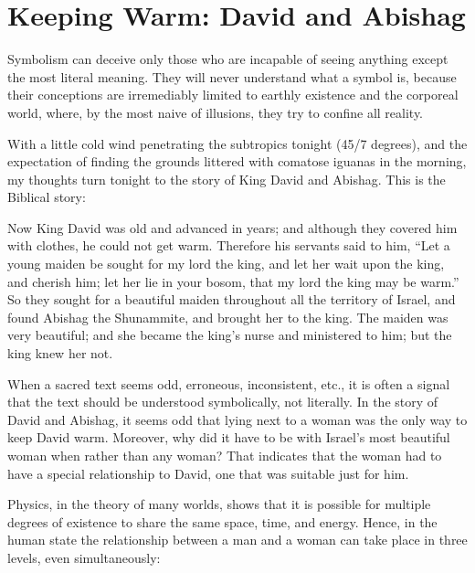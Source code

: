 \section{Keeping Warm: David and Abishag}

\begin{quotex} Symbolism can deceive only those who are incapable of seeing anything except the most literal meaning. They will never understand what a symbol is, because their conceptions are irremediably limited to earthly existence and the corporeal world, where, by the most naive of illusions, they try to confine all reality.
\end{quotex}


With a little cold wind penetrating the subtropics tonight (45/7 degrees), and the expectation of finding the grounds littered with comatose iguanas in the morning, my thoughts turn tonight to the story of King David and Abishag. This is the Biblical story:

\begin{quotex}
Now King David was old and advanced in years; and although they covered him with clothes, he could not get warm. Therefore his servants said to him, ``Let a young maiden be sought for my lord the king, and let her wait upon the king, and cherish him; let her lie in your bosom, that my lord the king may be warm.'' So they sought for a beautiful maiden throughout all the territory of Israel, and found Abishag the Shunammite, and brought her to the king. The maiden was very beautiful; and she became the king's nurse and ministered to him; but the king knew her not.
\end{quotex}


When a sacred text seems odd, erroneous, inconsistent, etc., it is often a signal that the text should be understood symbolically, not literally. In the story of David and Abishag, it seems odd that lying next to a woman was the only way to keep David warm. Moreover, why did it have to be with Israel's most beautiful woman when rather than any woman? That indicates that the woman had to have a special relationship to David, one that was suitable just for him.

Physics, in the theory of many worlds, shows that it is possible for multiple degrees of existence to share the same space, time, and energy. Hence, in the human state the relationship between a man and a woman can take place in three levels, even simultaneously:

